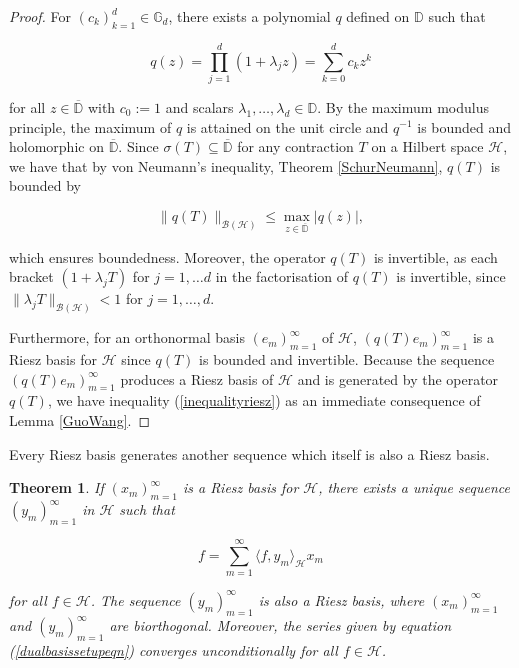 \documentclass[10pt, reqno]{amsart}
\newtheorem{theorem}{Theorem}[section]
\theoremstyle{definition}
\numberwithin{equation}{section}
\begin{document}
\begin{proof}
For $(c_{k})_{k=1}^{d}\in\mathbb{G}_{d}$, there exists a polynomial $q$ defined on $\mathbb{D}$ such that

$$q(z)=\prod_{j=1}^{d}(1+\lambda_{j}z) = \sum_{k=0}^{d}c_{k}z^{k}$$

\noindent for  all $z\in\overline{\mathbb{D}}$ with $c_{0}:=1$ and scalars $\lambda_{1},\hdots,\lambda_{d}\in\mathbb{D}$. By the maximum modulus principle, the maximum of $q$ is attained on the unit circle and $q^{-1}$ is bounded and holomorphic on $\overline{\mathbb{D}}$. Since $\sigma(T)\subseteq\overline{\mathbb{D}}$ for any contraction $T$ on a Hilbert space $\mathcal{H}$, we have that by von Neumann's inequality, Theorem \ref{SchurNeumann}, $q(T)$ is bounded by 

$$ \| q(T) \|_{\mathcal{B}(\mathcal{H})} \leq \max_{z\in\overline{\mathbb{D}}}\lvert q(z)\rvert,$$

\noindent which ensures boundedness. Moreover, the operator $q(T)$ is invertible, as each bracket $(1+\lambda_{j}T)$ for $j=1,\hdots d$ in the factorisation of $q(T)$ is invertible, since $\|\lambda_{j}T\|_{\mathcal{B}(\mathcal{H})}<1$ for $j=1,\hdots,d$. 

 Furthermore, for an orthonormal basis $(e_{m})_{m=1}^{\infty}$ of $\mathcal{H}$, $(q(T)e_{m})_{m=1}^{\infty}$ is a Riesz basis for $\mathcal{H}$ since $q(T)$ is bounded and invertible. Because the sequence $(q(T)e_{m})_{m=1}^{\infty}$ produces a Riesz basis of $\mathcal{H}$ and is generated by the operator $q(T)$, we have inequality (\ref{inequalityriesz}) as an immediate consequence of Lemma \ref{GuoWang}.\end{proof}

Every Riesz basis generates another sequence which itself is also a Riesz basis.

\begin{theorem}{}\label{dualbasis}
    If $(x_{m})_{m=1}^{\infty}$ is a Riesz basis for $\mathcal{H}$, there exists a unique sequence $(y_{m})_{m=1}^{\infty}$ in $\mathcal{H}$ such that

    \begin{equation}\label{dualbasissetupeqn}
       f=\sum_{m=1}^{\infty}\langle f,y_{m}\rangle_{\mathcal{H}}x_{m} 
    \end{equation}

\noindent for all $f\in\mathcal{H}$. The sequence $(y_{m})_{m=1}^{\infty}$ is also a Riesz basis, where $(x_{m})_{m=1}^{\infty}$ and $(y_{m})_{m=1}^{\infty}$ are biorthogonal. Moreover, the series given by equation (\ref{dualbasissetupeqn}) converges unconditionally for all $f\in\mathcal{H}$.
\end{theorem}
\end{document}
